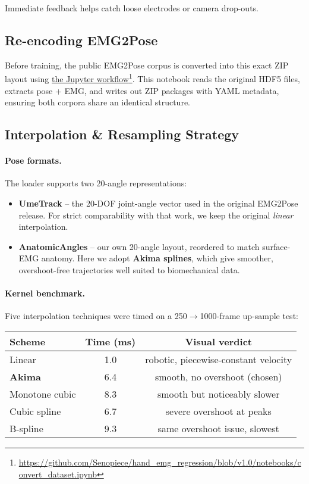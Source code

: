Immediate feedback helps catch loose electrodes or camera drop-outs.

\subsection{Re-encoding EMG2Pose}
Before training, the public EMG2Pose corpus is converted into this exact ZIP
layout using \href{https://github.com/Senopiece/hand_emg_regression/blob/v1.0/notebooks/convert_dataset.ipynb}{the Jupyter workflow}\footnote{\url{https://github.com/Senopiece/hand_emg_regression/blob/v1.0/notebooks/convert_dataset.ipynb}}. This notebook reads the original HDF5
files, extracts pose + EMG, and writes out ZIP packages with YAML metadata,
ensuring both corpora share an identical structure.

\subsection{Interpolation \& Resampling Strategy}

\paragraph{Pose formats.}
The loader supports two 20-angle representations:

\begin{itemize}
  \item \textbf{UmeTrack} -- the 20-DOF joint-angle vector used in the original
        EMG2Pose release. For strict comparability with that work, we keep the
        original \emph{linear} interpolation.
  \item \textbf{AnatomicAngles} -- our own 20-angle layout, reordered to match
        surface-EMG anatomy. Here we adopt \textbf{Akima splines}, which give
        smoother, overshoot-free trajectories well suited to biomechanical
        data.
\end{itemize}

\paragraph{Kernel benchmark.}
Five interpolation techniques were timed on a 250$\to$1000-frame up-sample test:

\begin{center}\small
\begin{tabular}{@{}lcc@{}}
\toprule
Scheme            & Time (ms) & Visual verdict \\ \midrule
Linear            & 1.0  & robotic, piecewise-constant velocity \\
\textbf{Akima}    & 6.4  & smooth, no overshoot (chosen) \\
Monotone cubic    & 8.3  & smooth but noticeably slower \\
Cubic spline      & 6.7  & severe overshoot at peaks \\
B-spline          & 9.3  & same overshoot issue, slowest \\ \bottomrule
\end{tabular}
\end{center}

